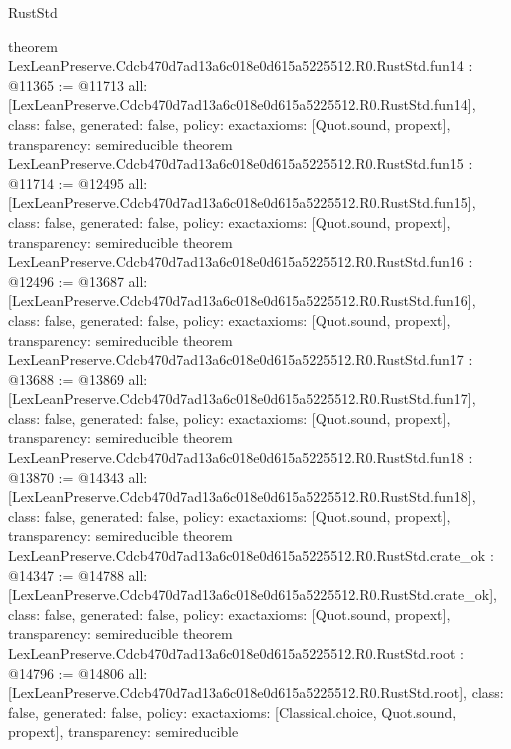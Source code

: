 \begin{lexlean}{RustStd}
\begin{coremodule}
{}
theorem LexLeanPreserve.Cdcb470d7ad13a6c018e0d615a5225512.R0.RustStd.fun14 : @11365 := @11713 {
  all: [LexLeanPreserve.Cdcb470d7ad13a6c018e0d615a5225512.R0.RustStd.fun14],
  class: false,
  generated: false,
  policy: exact{axioms: [Quot.sound, propext]},
  transparency: semireducible
}
theorem LexLeanPreserve.Cdcb470d7ad13a6c018e0d615a5225512.R0.RustStd.fun15 : @11714 := @12495 {
  all: [LexLeanPreserve.Cdcb470d7ad13a6c018e0d615a5225512.R0.RustStd.fun15],
  class: false,
  generated: false,
  policy: exact{axioms: [Quot.sound, propext]},
  transparency: semireducible
}
theorem LexLeanPreserve.Cdcb470d7ad13a6c018e0d615a5225512.R0.RustStd.fun16 : @12496 := @13687 {
  all: [LexLeanPreserve.Cdcb470d7ad13a6c018e0d615a5225512.R0.RustStd.fun16],
  class: false,
  generated: false,
  policy: exact{axioms: [Quot.sound, propext]},
  transparency: semireducible
}
theorem LexLeanPreserve.Cdcb470d7ad13a6c018e0d615a5225512.R0.RustStd.fun17 : @13688 := @13869 {
  all: [LexLeanPreserve.Cdcb470d7ad13a6c018e0d615a5225512.R0.RustStd.fun17],
  class: false,
  generated: false,
  policy: exact{axioms: [Quot.sound, propext]},
  transparency: semireducible
}
theorem LexLeanPreserve.Cdcb470d7ad13a6c018e0d615a5225512.R0.RustStd.fun18 : @13870 := @14343 {
  all: [LexLeanPreserve.Cdcb470d7ad13a6c018e0d615a5225512.R0.RustStd.fun18],
  class: false,
  generated: false,
  policy: exact{axioms: [Quot.sound, propext]},
  transparency: semireducible
}
theorem LexLeanPreserve.Cdcb470d7ad13a6c018e0d615a5225512.R0.RustStd.crate_ok : @14347 := @14788 {
  all: [LexLeanPreserve.Cdcb470d7ad13a6c018e0d615a5225512.R0.RustStd.crate_ok],
  class: false,
  generated: false,
  policy: exact{axioms: [Quot.sound, propext]},
  transparency: semireducible
}
theorem LexLeanPreserve.Cdcb470d7ad13a6c018e0d615a5225512.R0.RustStd.root : @14796 := @14806 {
  all: [LexLeanPreserve.Cdcb470d7ad13a6c018e0d615a5225512.R0.RustStd.root],
  class: false,
  generated: false,
  policy: exact{axioms: [Classical.choice, Quot.sound, propext]},
  transparency: semireducible
}


\end{coremodule}
\end{lexlean}
